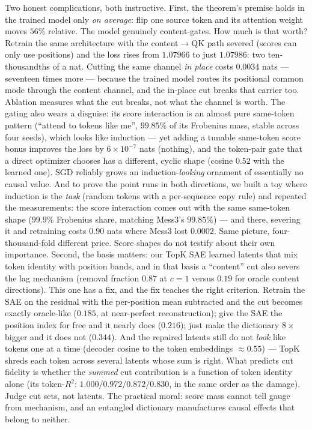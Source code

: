 \documentclass{article}
\begin{document}
Two honest complications, both instructive. First, the theorem's premise
holds in the trained model only \emph{on average}: flip one source token
and its attention weight moves $56\%$ relative. The model genuinely
content-gates. How much is that worth? Retrain the same architecture with
the content$\to$QK path severed (scores can only use positions) and the
loss rises from $1.07966$ to just $1.07986$: two ten-thousandths of a nat.
Cutting the same channel \emph{in place} costs $0.0034$ nats --- seventeen
times more --- because the trained model routes its positional common mode
through the content channel, and the in-place cut breaks that carrier too.
Ablation measures what the cut breaks, not what the channel is worth. The
gating also wears a disguise: its score interaction is an almost pure
same-token pattern (``attend to tokens like me'', $99.85\%$ of its
Frobenius mass, stable across four seeds), which looks like induction ---
yet adding a tunable same-token score bonus improves the loss by
$6 \times 10^{-7}$ nats (nothing), and the token-pair gate that a direct
optimizer chooses has a different, cyclic shape (cosine $0.52$ with the
learned one). SGD reliably grows an induction-\emph{looking} ornament of
essentially no causal value. And to prove the point runs in both
directions, we built a toy where induction is the \emph{task} (random
tokens with a per-sequence copy rule) and repeated the measurements: the
score interaction comes out with the same same-token shape ($99.9\%$
Frobenius share, matching Mess3's $99.85\%$) --- and there, severing it
and retraining costs $0.90$
nats where Mess3 lost $0.0002$. Same picture, four-thousand-fold
different price. Score shapes do not testify about their own importance.
Second, the basis matters: our TopK
SAE learned latents that mix token identity with position bands, and in
that basis a ``content'' cut also severs the lag mechanism (removal
fraction $0.87$ at $c=1$ versus $0.19$ for oracle content directions).
This one has a fix, and the fix teaches the right criterion. Retrain the
SAE on the residual with the per-position mean subtracted and the cut
becomes exactly oracle-like ($0.185$, at near-perfect reconstruction);
give the SAE the position index for free and it nearly does ($0.216$);
just make the dictionary $8\times$ bigger and it does not ($0.344$). And
the repaired latents still do not \emph{look} like tokens one at a time
(decoder cosine to the token embeddings $\approx 0.55$) --- TopK shreds
each token across several latents whose sum is right. What predicts cut
fidelity is whether the \emph{summed} cut contribution is a function of
token identity alone (its token-$R^2$: $1.000/0.972/0.872/0.830$, in the
same order as the damage). Judge cut sets, not latents. The
practical moral: score mass cannot tell gauge from mechanism, and an
entangled dictionary manufactures causal effects that belong to neither.
\end{document}
